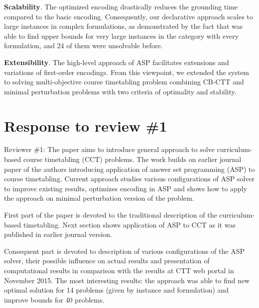 \documentclass[a4j]{article}
\begin{document}
\begin{itemize}
\begin{it}
\begin{list}{}{}
\item \textbf{Scalability}. 
The optimized encoding drastically reduces the grounding time compared
to the basic encoding.
Consequently, our declarative approach scales to large instances in
complex formulations, as demonstrated by the fact that
{\asap} was able to find upper bounds for very
large instances in the category  with every
formulation, and 24 of them were unsolvable before. 

\item \textbf{Extensibility}. 
The high-level approach of ASP facilitates extensions and variations
of first-order encodings.
From this viewpoint, 
we extended the {\asap} system to solving multi-objective course
timetabling problem combining CB-CTT and minimal perturbation problems
with two criteria of optimality and stability.
\end{list}
\end{it}
\end{itemize}

\section*{Response to review \#1}
\begin{it}\color{blue}
Reviewer \#1: The paper aims to introduce general approach to solve
curriculum-based course timetabling (CCT) problems. The work builds on
earlier journal paper of the authors introducing application of answer
set programming (ASP) to course timetabling.  Current approach studies
various configurations of ASP solver to improve existing results,
optimizes encoding in ASP and shows how to apply the approach on
minimal perturbation version of the problem.

First part of the paper is devoted to the traditional description of
the curriculum-based timetabling. Next section shows application of
ASP to CCT as it was published in earlier journal version.

Consequent part is devoted to description of various configurations of
the ASP solver, their possible influence on actual results and
presentation of computational results in comparison with the results
at CTT web portal in November 2015. The most interesting results: the
approach was able to find new optimal solution for 14 problems (given
by instance and formulation) and improve bounds for 40 problems.
\end{it}
\end{document}
